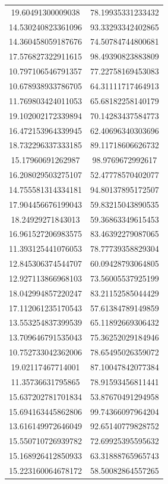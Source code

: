 \begin{table}
\begin{tabular}{cc}
19.60491300009038 & 78.19935331233432 \\
14.530240823361096 & 93.33293342402865 \\
14.360458059187676 & 74.50784744800681 \\
17.576827322911615 & 98.49390823883809 \\
10.797106546791357 & 77.22758169453083 \\
10.678938933786705 & 64.31111717464913 \\
11.769803424011053 & 65.68182258140179 \\
19.102002172339894 & 70.14283437584773 \\
16.472153964339945 & 62.40696340303696 \\
18.732296337333185 & 89.11718606626732 \\
15.17960691262987 & 98.9769672992617 \\
16.208029503275107 & 52.47778570402077 \\
14.755581314334181 & 94.80137895172507 \\
17.904456676199043 & 59.83215043890535 \\
18.24929271843013 & 59.36863349615453 \\
16.961527206983575 & 83.46392279087065 \\
11.393125441076053 & 78.77739358829304 \\
12.845306374544707 & 60.09428793064805 \\
12.927113866968103 & 73.56005537925199 \\
18.042994857220247 & 83.21152585044429 \\
17.112061235170543 & 57.61384789149859 \\
13.553254837399539 & 65.11892669306432 \\
13.709646791535043 & 75.36252029184946 \\
10.752733042362006 & 78.65495026359072 \\
19.02117467714001 & 87.10047842077384 \\
11.35736631795865 & 78.91593456811441 \\
15.637202781701834 & 53.87670491294958 \\
15.694163445862806 & 99.74366097964204 \\
13.616149972646049 & 92.65140779828752 \\
15.550710726939782 & 72.69925395595632 \\
15.168926412850933 & 63.31888765965743 \\
15.223160064678172 & 58.50082864557265 \\

\end{tabular}
\end{table}
